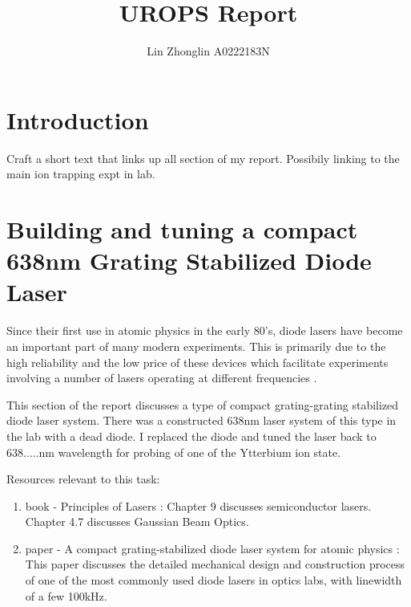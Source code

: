 \documentclass[12pt,A4Paper]{article}
\title{UROPS Report}
\author{Lin Zhonglin \hspace{1cm} A0222183N}
\begin{document}
\maketitle
\tableofcontents
\section{Introduction}
Craft a short text that links up all section of my report. Possibily linking to the main ion trapping expt in lab. 

\section{Building and tuning a compact 638nm Grating Stabilized Diode Laser}
Since their first use in atomic physics in the early 80's, diode lasers have become an important part of many modern experiments. This is primarily due to the high reliability and the low price of these devices which facilitate experiments involving a number of lasers operating at different frequencies \cite{compactGratingDiodeLaser}.
\par
This section of the report discusses a type of compact grating-grating stabilized diode laser system. There was a constructed 638nm laser system of this type in the lab with a dead diode. I replaced the diode and tuned the laser back to 638.....nm wavelength for probing of one of the Ytterbium ion state. 
\par
Resources relevant to this task: 
\begin{enumerate}
    \item book - Principles of Lasers \cite{principleOfLasersOrazio}: Chapter 9 discusses semiconductor lasers. Chapter 4.7 discusses Gaussian Beam Optics. 
    \item paper - A compact grating-stabilized diode laser system for atomic physics \cite{compactGratingDiodeLaser}: This paper discusses the detailed mechanical design and construction process of one of the most commonly used diode lasers in optics labs, with linewidth of a few 100kHz. 
\end{enumerate}
\end{document}
